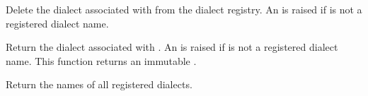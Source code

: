 \documentclass[letterpaper,10pt,english]{sphinxmanual}
\begin{document}

\vspace{5px}

\begin{fulllineitems}
\label{\detokenize{csv:csv.unregister_dialect}}
Delete the dialect associated with  from the dialect registry.  An
{\hyperref[\detokenize{csv:csv.Error}]{}} is raised if  is not a registered dialect name.

\end{fulllineitems}


\vspace{5px}

\begin{fulllineitems}
\label{\detokenize{csv:csv.get_dialect}}
Return the dialect associated with .  An {\hyperref[\detokenize{csv:csv.Error}]{}} is raised if
 is not a registered dialect name.  This function returns an immutable
{\hyperref[\detokenize{csv:csv.Dialect}]{}}.

\end{fulllineitems}


\vspace{5px}

\begin{fulllineitems}
\label{\detokenize{csv:csv.list_dialects}}
Return the names of all registered dialects.

\end{fulllineitems}
\end{document}
